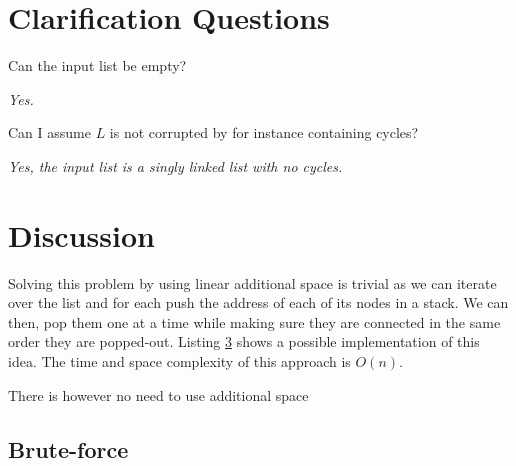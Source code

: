 

\section{Clarification Questions}

\begin{QandA}
	\item Can the input list be empty? 
	\begin{answered}
		\textit{Yes.}
	\end{answered}

	\item Can I assume $L$ is not corrupted by for instance containing cycles? 
	\begin{answered}
		\textit{Yes, the input list is a singly linked list with no cycles.}
	\end{answered}
	
\end{QandA}

\section{Discussion}
\label{list_reverse:sec:discussion}
Solving this problem by using linear additional space is  trivial as we can iterate over the list and for each push the address of each of its nodes in a stack. 
We can then, pop them one at a time while making sure they are connected in the same order they are popped-out. Listing \ref{} shows a possible implementation of this idea. 
The time and space complexity of this approach is $O(n)$.




There is however no need to use additional space 
\subsection{Brute-force}




\section{}